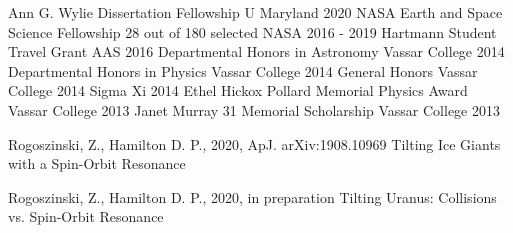 \documentclass[]{awesome-cv}
\begin{document}
\vspace{-11mm}
\begin{cvhonors}
	\cvhonor
	{Ann G. Wylie Dissertation Fellowship}
	{}
	{U Maryland}
	{2020}
	\cvhonor
	{NASA Earth and Space Science Fellowship}
	{28 out of 180 selected}
	{NASA}
	{2016 - 2019}
	\cvhonor
	{Hartmann Student Travel Grant}
	{}
	{AAS}
	{2016}
	\cvhonor
	{Departmental Honors in Astronomy}
	{}
	{Vassar College}
	{2014}
	\cvhonor
	{Departmental Honors in Physics}
	{}
	{Vassar College}
	{2014}
	\cvhonor
	{General Honors}
	{}
	{Vassar College}
	{2014}
	\cvhonor
	{Sigma Xi}
	{}
	{}
	{2014}
	\cvhonor
	{Ethel Hickox Pollard Memorial Physics Award}
	{}
	{Vassar College}
	{2013}
	\cvhonor
	{Janet Murray \textquotesingle{}31 Memorial Scholarship}
	{}
	{Vassar College}
	{2013}
\end{cvhonors}
\begin{cventries}
	\cventry
	{Rogoszinski, Z., Hamilton D. P., 2020, ApJ. arXiv:1908.10969}
	{Tilting Ice Giants with a Spin-Orbit Resonance}
	{}
	{}
	{}
	
	\vspace{-6mm}
\end{cventries}

\begin{cventries}
	\cventry
	{Rogoszinski, Z., Hamilton D. P., 2020, in preparation}
	{Tilting Uranus: Collisions vs. Spin-Orbit Resonance}
	{}
	{}
	{}
	
	\vspace{-6mm}
\end{cventries}
\end{document}
